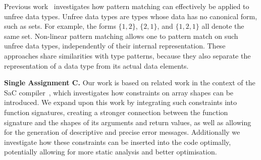 Previous work~\cite{active-patterns, non-linear-backtracking, non-linear-scoping} investigates how pattern matching can effectively be applied to unfree data types.
Unfree data types are types whose data has no canonical form, such as sets.
For example, the forms $\{ 1, 2 \}$, $\{ 2, 1 \}$, and $\{ 1, 2, 1 \}$ all denote the same set.
Non-linear pattern matching allows one to pattern match on such unfree data types, independently of their internal representation.
These approaches share similarities with type patterns, because they also separate the representation of a data type from its actual data elements.

\textbf{Single Assignment C.}
Our work is based on related work in the context of the SaC compiler~\cite{sac-contracts, sac-user-constraints, sac-hybrid-types}, which investigates how constraints on array shapes can be introduced.
We expand upon this work by integrating such constraints into function signatures, creating a stronger connection between the function signature and the shapes of its arguments and return values, as well as allowing for the generation of descriptive and precise error messages.
Additionally we investigate how these constraints can be inserted into the code optimally, potentially allowing for more static analysis and better optimisation.
